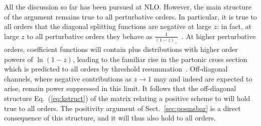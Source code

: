 All the discussion so far has been pursued at NLO\@. However, the main
structure of the argument remains true to all perturbative orders. In
particular,  it is true to all orders that the diagonal splitting
functions are negative at large $z$: in fact, at large $z$ to all
perturbative orders they behave as $\frac{1}{(1-z)_+}$~\cite{Albino:2000cp}. At higher
perturbative orders, coefficient functions will contain plus distributions with higher order
powers of $\ln(1-z)$, leading to  the familiar rise in the partonic
cross section which is predicted to all orders by threshold
resummation~\cite{Catani:1989ne,Sterman:1986aj}. Off-diagonal
channels, where negative contributions as $z\to1$ may and indeed are
expected to arise, 
remain power suppressed in this limit. It follows that the
off-diagonal structure Eq.~(\ref{eq:kstruct})
of the matrix relating a positive scheme to \msbar{} will hold true to
all orders. The positivity argument of Sect.~\ref{sec:posmsbar} is a
direct consequence of this structure, and it will thus also hold to
all orders.

